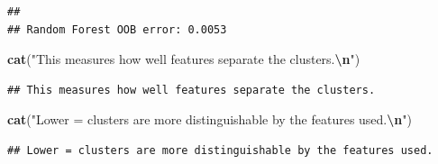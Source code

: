 \documentclass[
]{article}
\newenvironment{Shaded}{\begin{snugshade}}{\end{snugshade}}
\newcommand{\FunctionTok}[1]{\textcolor[rgb]{0.13,0.29,0.53}{\textbf{#1}}}
\newcommand{\NormalTok}[1]{#1}
\newcommand{\SpecialCharTok}[1]{\textcolor[rgb]{0.81,0.36,0.00}{\textbf{#1}}}
\newcommand{\StringTok}[1]{\textcolor[rgb]{0.31,0.60,0.02}{#1}}
\begin{document}
\begin{verbatim}
## 
## Random Forest OOB error: 0.0053
\end{verbatim}

\begin{Shaded}
\begin{Highlighting}[]
\FunctionTok{cat}\NormalTok{(}\StringTok{"This measures how well features separate the clusters.}\SpecialCharTok{\textbackslash{}n}\StringTok{"}\NormalTok{)}
\end{Highlighting}
\end{Shaded}

\begin{verbatim}
## This measures how well features separate the clusters.
\end{verbatim}

\begin{Shaded}
\begin{Highlighting}[]
\FunctionTok{cat}\NormalTok{(}\StringTok{"Lower = clusters are more distinguishable by the features used.}\SpecialCharTok{\textbackslash{}n}\StringTok{"}\NormalTok{)}
\end{Highlighting}
\end{Shaded}

\begin{verbatim}
## Lower = clusters are more distinguishable by the features used.
\end{verbatim}
\end{document}
